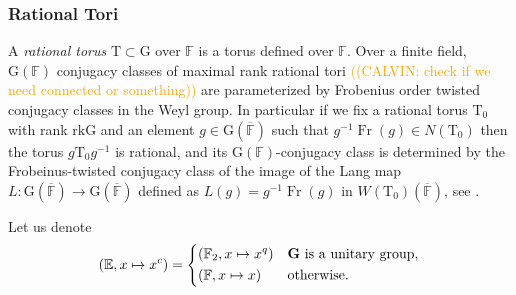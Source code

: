 \documentclass[12pt, reqno]{amsart}
\theoremstyle{definition}
\theoremstyle{definition}
\theoremstyle{definition}
\newcommand{\involution}[1]{#1^{c}}
\newcommand{\finiteField}{\mathbb{F}}
\newcommand{\quadraticExtension}{\mathbb{E}}
\newcommand{\finiteFieldExtension}[1]{\finiteField_{#1}}
\newcommand{\algebraicClosure}[1]{\overline{#1}}
\newcommand{\Frobenius}{\operatorname{Fr}}
\newcommand{\algebraicGroup}[1]{\boldsymbol{\mathrm{#1}}}
\newcommand{\calvin}[1]{\textcolor{orange}{\sffamily ((CALVIN: #1))}}
\begin{document}
\subsubsection{Rational Tori}\label{subsubsec:rational-tori}
A \emph{rational torus} $\algebraicGroup{T} \subset \algebraicGroup{G}$ over $\finiteField$ is a torus defined over $\finiteField$. 
Over a finite field, $\algebraicGroup{G}(\finiteField)$ conjugacy classes of maximal rank rational tori \calvin{check if we need connected or something} are parameterized by  Frobenius order twisted conjugacy classes in the Weyl group. In particular if we fix a rational torus $\algebraicGroup{T}_0$ with rank $\mathrm{rk} \algebraicGroup{G}$ and an element $g \in \algebraicGroup{G}(\algebraicClosure{\finiteField})$ such that $g^{-1}\Frobenius(g) \in N(\algebraicGroup{T}_0)$ then the torus $g\algebraicGroup{T}_0g^{-1}$ is rational, and its $\algebraicGroup{G}(\finiteField)$-conjugacy class is determined  by the Frobeinus-twisted conjugacy class of the image of the Lang map $L \colon \algebraicGroup{G}\left(\algebraicClosure{\finiteField}\right) \to \algebraicGroup{G}\left(\algebraicClosure{\finiteField}\right)$ defined as $L\left(g\right) = g^{-1}\Frobenius(g)$ in $W(\algebraicGroup{T}_0)(\algebraicClosure{\mathbb{F}})$, see \cite[Section 3.3]{Carter1985}.



Let us denote $$\left(\quadraticExtension, x \mapsto \involution{x}\right) = \begin{dcases}
	\left(\finiteFieldExtension{2}, x \mapsto x^q\right)  & \algebraicGroup{G} \text{ is a unitary group},\\
	\left(\finiteField, x \mapsto x\right) & \text{otherwise.}
\end{dcases}$$
\end{document}
